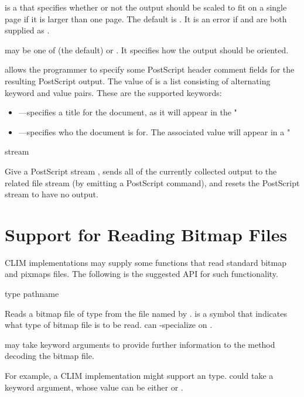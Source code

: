  is a  that specifies whether or not the output
should be scaled to fit on a single page if it is larger than one page.  The
default is .  It is an error if  and 
are both supplied as .

 may be one of  (the default) or .
It specifies how the output should be oriented.

 allows the programmer to specify some PostScript header
comment fields for the resulting PostScript output.  The value of
 is a list consisting of alternating keyword and value
pairs.  These are the supported keywords:

\begin{itemize}
\item {}---specifies a title for the document, as it will appear in the
"%

\item {}---specifies who the document is for.  The associated value will
appear in a "%
\end{itemize}


 {stream}

Give a PostScript stream ,  sends all of the currently
collected output to the related file stream (by emitting a PostScript
 command), and resets the PostScript stream to have no output.


\section {Support for Reading Bitmap Files}

CLIM implementations may supply some functions that read standard bitmap and
pixmaps files.  The following is the suggested API for such functionality.

 {type pathname \key}

Reads a bitmap file of type  from the file named by .
 is a symbol that indicates what type of bitmap file is to be read.  
 can -specialize on .

 may take keyword arguments to provide further information
to the method decoding the bitmap file.

For example, a CLIM implementation might support an  type.
 could take a  keyword argument, whose value
can be either  or .

